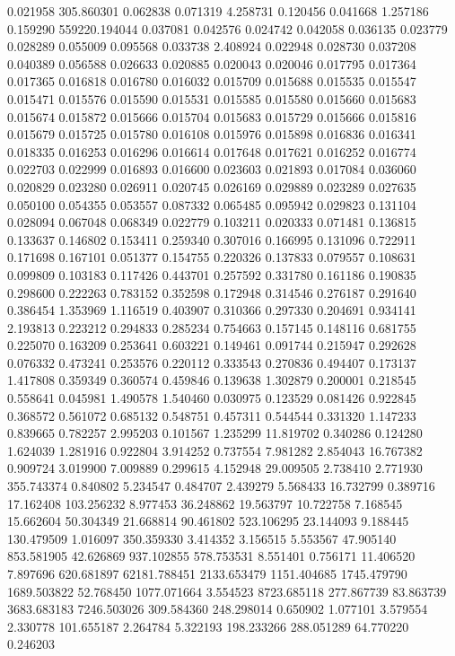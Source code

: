 0.021958
305.860301
0.062838
0.071319
4.258731
0.120456
0.041668
1.257186
0.159290
559220.194044
0.037081
0.042576
0.024742
0.042058
0.036135
0.023779
0.028289
0.055009
0.095568
0.033738
2.408924
0.022948
0.028730
0.037208
0.040389
0.056588
0.026633
0.020885
0.020043
0.020046
0.017795
0.017364
0.017365
0.016818
0.016780
0.016032
0.015709
0.015688
0.015535
0.015547
0.015471
0.015576
0.015590
0.015531
0.015585
0.015580
0.015660
0.015683
0.015674
0.015872
0.015666
0.015704
0.015683
0.015729
0.015666
0.015816
0.015679
0.015725
0.015780
0.016108
0.015976
0.015898
0.016836
0.016341
0.018335
0.016253
0.016296
0.016614
0.017648
0.017621
0.016252
0.016774
0.022703
0.022999
0.016893
0.016600
0.023603
0.021893
0.017084
0.036060
0.020829
0.023280
0.026911
0.020745
0.026169
0.029889
0.023289
0.027635
0.050100
0.054355
0.053557
0.087332
0.065485
0.095942
0.029823
0.131104
0.028094
0.067048
0.068349
0.022779
0.103211
0.020333
0.071481
0.136815
0.133637
0.146802
0.153411
0.259340
0.307016
0.166995
0.131096
0.722911
0.171698
0.167101
0.051377
0.154755
0.220326
0.137833
0.079557
0.108631
0.099809
0.103183
0.117426
0.443701
0.257592
0.331780
0.161186
0.190835
0.298600
0.222263
0.783152
0.352598
0.172948
0.314546
0.276187
0.291640
0.386454
1.353969
1.116519
0.403907
0.310366
0.297330
0.204691
0.934141
2.193813
0.223212
0.294833
0.285234
0.754663
0.157145
0.148116
0.681755
0.225070
0.163209
0.253641
0.603221
0.149461
0.091744
0.215947
0.292628
0.076332
0.473241
0.253576
0.220112
0.333543
0.270836
0.494407
0.173137
1.417808
0.359349
0.360574
0.459846
0.139638
1.302879
0.200001
0.218545
0.558641
0.045981
1.490578
1.540460
0.030975
0.123529
0.081426
0.922845
0.368572
0.561072
0.685132
0.548751
0.457311
0.544544
0.331320
1.147233
0.839665
0.782257
2.995203
0.101567
1.235299
11.819702
0.340286
0.124280
1.624039
1.281916
0.922804
3.914252
0.737554
7.981282
2.854043
16.767382
0.909724
3.019900
7.009889
0.299615
4.152948
29.009505
2.738410
2.771930
355.743374
0.840802
5.234547
0.484707
2.439279
5.568433
16.732799
0.389716
17.162408
103.256232
8.977453
36.248862
19.563797
10.722758
7.168545
15.662604
50.304349
21.668814
90.461802
523.106295
23.144093
9.188445
130.479509
1.016097
350.359330
3.414352
3.156515
5.553567
47.905140
853.581905
42.626869
937.102855
578.753531
8.551401
0.756171
11.406520
7.897696
620.681897
62181.788451
2133.653479
1151.404685
1745.479790
1689.503822
52.768450
1077.071664
3.554523
8723.685118
277.867739
83.863739
3683.683183
7246.503026
309.584360
248.298014
0.650902
1.077101
3.579554
2.330778
101.655187
2.264784
5.322193
198.233266
288.051289
64.770220
0.246203

